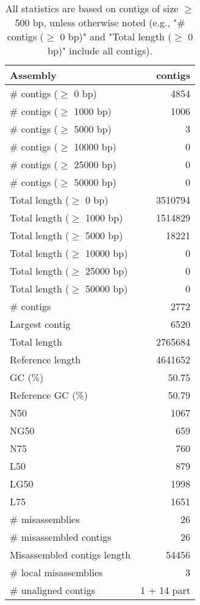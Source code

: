 \documentclass[12pt,a4paper]{article}
\begin{document}
\begin{table}[ht]
\begin{center}
\caption{All statistics are based on contigs of size $\geq$ 500 bp, unless otherwise noted (e.g., "\# contigs ($\geq$ 0 bp)" and "Total length ($\geq$ 0 bp)" include all contigs).}
\begin{tabular}{|l*{1}{|r}|}
\hline
Assembly & contigs \\ \hline
\# contigs ($\geq$ 0 bp) & 4854 \\ \hline
\# contigs ($\geq$ 1000 bp) & 1006 \\ \hline
\# contigs ($\geq$ 5000 bp) & 3 \\ \hline
\# contigs ($\geq$ 10000 bp) & 0 \\ \hline
\# contigs ($\geq$ 25000 bp) & 0 \\ \hline
\# contigs ($\geq$ 50000 bp) & 0 \\ \hline
Total length ($\geq$ 0 bp) & 3510794 \\ \hline
Total length ($\geq$ 1000 bp) & 1514829 \\ \hline
Total length ($\geq$ 5000 bp) & 18221 \\ \hline
Total length ($\geq$ 10000 bp) & 0 \\ \hline
Total length ($\geq$ 25000 bp) & 0 \\ \hline
Total length ($\geq$ 50000 bp) & 0 \\ \hline
\# contigs & 2772 \\ \hline
Largest contig & 6520 \\ \hline
Total length & 2765684 \\ \hline
Reference length & 4641652 \\ \hline
GC (\%) & 50.75 \\ \hline
Reference GC (\%) & 50.79 \\ \hline
N50 & 1067 \\ \hline
NG50 & 659 \\ \hline
N75 & 760 \\ \hline
L50 & 879 \\ \hline
LG50 & 1998 \\ \hline
L75 & 1651 \\ \hline
\# misassemblies & 26 \\ \hline
\# misassembled contigs & 26 \\ \hline
Misassembled contigs length & 54456 \\ \hline
\# local misassemblies & 3 \\ \hline
\# unaligned contigs & 1 + 14 part \\ \hline

\end{tabular}
\end{center}
\end{table}
\end{document}
